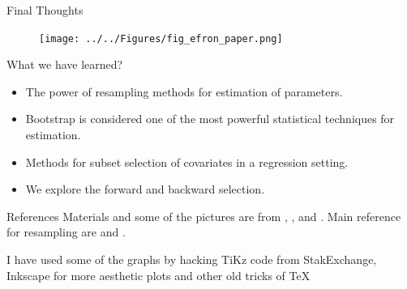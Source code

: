\documentclass{beamer}
\begin{document}
\begin{frame}{Final Thoughts}
	
	
	\begin{figure}[h]
		\centering
		\texttt{[image: ../../Figures/fig\_efron\_paper.png]}
	\end{figure}
\end{frame}
		
\begin{frame}{What we have learned?	}
	\begin{itemize}
		\item The power of resampling methods for estimation of parameters.
		\item Bootstrap is considered one of the most powerful statistical techniques for estimation. 
		\item Methods for subset selection of covariates in a regression setting.
		\item We explore the forward and backward selection.
	\end{itemize}
\end{frame}

\begin{frame}{References}
	Materials and some of the pictures are from \citep{James2015}, \citep{hastie01}, and \citep{geron2}. Main reference for resampling are \citep{efronbook} and \citep{efron2012}.
	\printbibliography 	
	
	I have used some of the graphs by hacking TiKz code from StakExchange, Inkscape for more aesthetic plots and other old tricks of \TeX
	
\end{frame}



	
\end{document}
